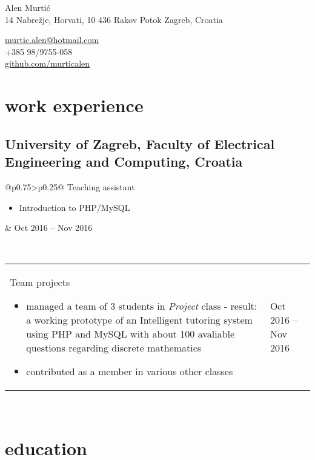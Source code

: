 \documentclass[a4paper]{article}
\makeatletter
\newlength{\tablewidth}
\newenvironment{period}[2]{%
\newcommand{\sarma}{#2}%
\setlength{\tablewidth}{\linewidth}
\addtolength{\tablewidth}{-2\tabcolsep}
\begin{tabular}{@{}p{0.75\tablewidth}>{\raggedleft\arraybackslash}p{0.25\tablewidth}@{}}%
#1 \newline
\begin{itemize}
}{%
\end{itemize} & \sarma \\%
\end{tabular}\\
}
\makeatother
\begin{document}
\fontfamily{\sfdefault}
\selectfont

\begin{minipage}{.5\textwidth}
\LARGE{Alen Murtić}\\
\normalsize{14 Nabrežje, Horvati, 10 436 Rakov Potok
	\newline
	Zagreb, Croatia}
\end{minipage}%
\begin{minipage}{.5\textwidth}
\raggedleft
\href{mailto:murtic.alen@hotmail.com}{murtic.alen@hotmail.com} \\
+385 98/9755-058 \\
\href{https://github.com/murticalen}{github.com/murticalen}
\end{minipage}

\vspace{1em}

\section{work experience}

\subsection{University of Zagreb, Faculty of Electrical Engineering and Computing, Croatia}
\begin{period}{Teaching assistant}{Oct 2016 -- Nov 2016}
	\item Introduction to PHP/MySQL
\end{period}
\begin{period}{Team projects}{}
	\item managed a team of 3 students in \textit{Project} class
	\newline
	- result: a working prototype of an Intelligent tutoring system using PHP and MySQL with about 100 avaliable questions regarding discrete mathematics
	\item contributed as a member in various other classes\end{period}

\section{education}
\end{document}
